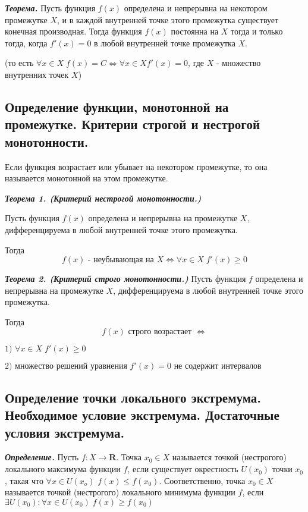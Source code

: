 \documentclass[a4paper,12pt]{article}
\theoremstyle{plain} %
\theoremstyle{definition} %
\theoremstyle{remark} %
\begin{document}
\textbf{\textit{Теорема.}} Пусть функция $f(x)$ определена и непрерывна на некотором промежутке $X$, и в каждой внутренней точке этого промежутка существует конечная производная. Тогда функция $f(x)$ постоянна на $X$ тогда и только тогда, когда $f'(x) = 0$ в любой внутренней точке промежутка $X$.

(то есть $\forall x \in X \; f(x) = C \Leftrightarrow \forall x \in X f'(x) = 0$, где $X$ - множество внутренних точек $X$)


\newpage
\subsection*{Определение функции, монотонной на промежутке. Критерии строгой и нестрогой монотонности. }

Если функция возрастает или убывает на некотором промежутке, то она называется монотонной на этом промежутке.

\textit{\textbf{Теорема 1. (Критерий нестрогой монотонности.)}}

Пусть функция $f(x)$ определена и непрерывна на промежутке $X$, дифференцируема в любой внутренней точке этого промежутка.

Тогда
\[ f(x) \text{ - неубывающая на }X \Leftrightarrow \forall x \in X \; f'(x) \geq 0 \]

\textit{\textbf{Теорема 2. (Критерий строго монотонности.)}}
Пусть функция $f$ определена и непрерывна на промежутке $X$, дифференцируема в любой внутренней точке этого промежутка.

Тогда
\[
	f(x) \text{ строго возрастает } \Leftrightarrow \]

$\text{1) } \forall x \in X \; f'(x) \geq 0  $

$\text{2) множество решений уравнения } f'(x) = 0 \text{ не содержит интервалов} $


\newpage
\subsection*{Определение точки локального экстремума. Необходимое условие экстремума. Достаточные условия экстремума. }

\textit{\textbf{Определение.}} Пусть $f: X \rightarrow \mathbf{R}$. Точка $x_0 \in X$ называется точкой (нестрогого) локального максимума функции $f$, если существует окрестность $U(x_0)$ точки $x_0$, такая что $\forall x \in U(x_o)$ $f(x) \leq f(x_0)$. Соответственно, точка $x_0 \in X$ называется точкой (нестрогого) локального минимума функции $f$, если $\exists U(x_0): \forall x \in U(x_0) \; f(x) \geq f(x_0)$
\end{document}

